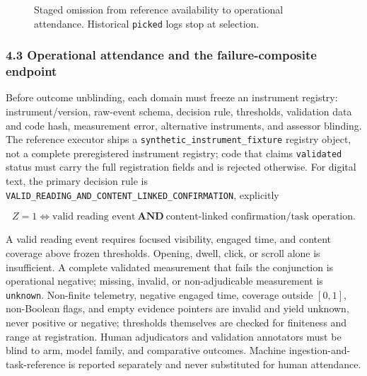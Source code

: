 \documentclass[
  11pt]{article}
\begin{document}
\begin{figure}[htbp]
\centering
{}
\caption{Staged omission from reference availability to operational attendance. Historical \texttt{picked} logs stop at selection.}
\label{fig:omission-stages}
\end{figure}

\subsubsection{4.3 Operational attendance and the failure-composite
endpoint}\label{operational-attendance-and-the-failure-composite-endpoint}

Before outcome unblinding, each domain must freeze an instrument
registry: instrument/version, raw-event schema, decision rule,
thresholds, validation data and code hash, measurement error,
alternative instruments, and assessor blinding. The reference executor
ships a \texttt{synthetic\_instrument\_fixture} registry object, not a
complete preregistered instrument registry; code that claims
\texttt{validated} status must carry the full registration fields and is
rejected otherwise. For digital text, the primary decision rule is
\texttt{VALID\_READING\_AND\_CONTENT\_LINKED\_CONFIRMATION}, explicitly

\[Z=1\iff \text{valid reading event}\ \mathbf{AND}\ \text{content-linked confirmation/task operation}.\]

A valid reading event requires focused visibility, engaged time, and
content coverage above frozen thresholds. Opening, dwell, click, or
scroll alone is insufficient. A complete validated measurement that
fails the conjunction is operational negative; missing, invalid, or
non-adjudicable measurement is \texttt{unknown}. Non-finite telemetry,
negative engaged time, coverage outside \([0,1]\), non-Boolean flags,
and empty evidence pointers are invalid and yield unknown, never
positive or negative; thresholds themselves are checked for finiteness
and range at registration. Human adjudicators and validation annotators
must be blind to arm, model family, and comparative outcomes. Machine
ingestion-and-task-reference is reported separately and never
substituted for human attendance.
\end{document}
